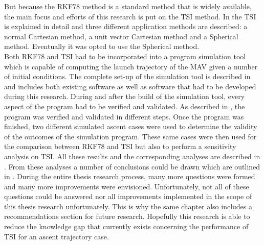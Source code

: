 But because the \ac{RKF78} method is a standard method that is widely available, the main focus and efforts of this research is put on the \ac{TSI} method. In  the \ac{TSI} is explained in detail and three different application methods are described: a normal Cartesian method, a unit vector Cartesian method and a Spherical method. Eventually it was opted to use the Spherical method. \\
Both \ac{RKF78} and \ac{TSI} had to be incorporated into a program simulation tool which is capable of computing the launch trajectory of the \ac{MAV} given a number of initial conditions. The complete set-up of the simulation tool is described in  and includes both existing software as well as software that had to be developed during this research. 
During and after the build of the simulation tool, every aspect of the program had to be verified and validated. As described in , the program was verified and validated in different steps. Once the program was finished, two different simulated ascent cases were used to determine the validity of the outcomes of the simulation program.
These same cases were then used for the comparison between \ac{RKF78} and \ac{TSI} but also to perform a sensitivity analysis on \ac{TSI}. All these results and the corresponding analyses are described in .
From these analyses a number of conclusions could be drawn which are outlined in . During the entire thesis research process, many more questions were formed and many more improvements were envisioned. Unfortunately, not all of these questions could be answered nor all improvements implemented in the scope of this thesis research unfortunately. This is why the same chapter also includes a recommendations section for future research. 
Hopefully this research is able to reduce the knowledge gap that currently exists concerning the performance of \ac{TSI} for an ascent trajectory case.





